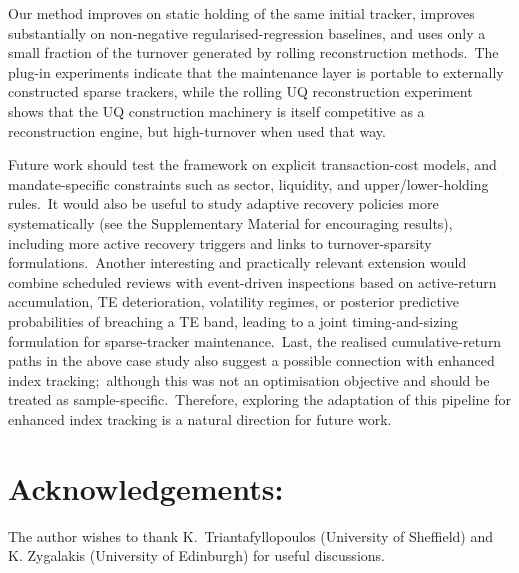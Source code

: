 \documentclass[11pt]{article}
\begin{document}
Our method improves on static holding of the same initial tracker, improves substantially on non-negative regularised-regression baselines, and uses only a small fraction of the turnover generated by rolling reconstruction methods.\ The plug-in experiments indicate that the maintenance layer is portable to externally constructed sparse trackers, while the rolling UQ reconstruction experiment shows that the UQ construction machinery is itself competitive as a reconstruction engine, but high-turnover when used that way.

Future work should test the framework on explicit transaction-cost models, and mandate-specific constraints such as sector, liquidity, and upper/lower-holding rules.\ It would also be useful to study adaptive recovery policies more systematically (see the Supplementary Material for encouraging results), including more active recovery triggers and links to turnover-sparsity formulations.\ Another interesting and practically relevant extension would combine scheduled reviews with event-driven inspections based on active-return accumulation, TE deterioration, volatility regimes, or posterior predictive probabilities of breaching a TE band, leading to a joint timing-and-sizing formulation for sparse-tracker maintenance.\ Last, the realised cumulative-return paths in the above case study also suggest a possible connection with enhanced index tracking;\ although this was not an optimisation objective and should be treated as sample-specific.\ Therefore, exploring the adaptation of this pipeline for enhanced index tracking is a natural direction for future work.

\section*{Acknowledgements:} The author wishes to thank K.\ Triantafyllopoulos (University of Sheffield) and K. Zygalakis (University of Edinburgh) for useful discussions. 



%
%

\appendix

\renewcommand{\thesubsection}{\Alph{section}.\arabic{subsection}}
\renewcommand{\thesubsubsection}{\Alph{section}.\arabic{subsection}.\arabic{subsubsection}}
\end{document}
